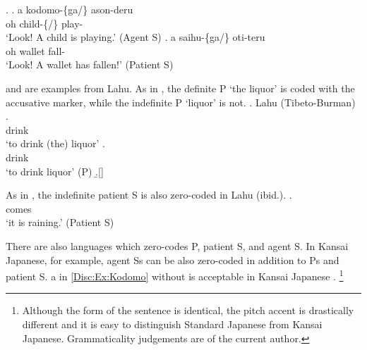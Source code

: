 \ex.\label{Disc:Ex:Kodomo}
	\ag. a kodomo-\{ga/\} ason-deru \\
		oh child-\{/\EM{\O}\} play- \\
		`Look! A child is playing.' \hfill{(Agent S)}
		\bg. a saihu-\{ga/\EM{\O}\} oti-teru \\
			oh wallet fall- \\
			`Look! A wallet has fallen!' \hfill{(Patient S)}

\Next and \NNext are examples from Lahu.
As in \Next[a],
the definite P `the liquor' is coded with the accusative marker,
while the indefinite P `liquor' is not.
\ex. Lahu (Tibeto-Burman)
 \ag.  {}  \\
	  drink \\
	`to drink (the) liquor'
 \bg.   \\
	 drink \\
	`to drink liquor' \hfill{(P)}
 \b.[] \hfill{\cite[p.\ 307]{matisoff81}}

As in \Next,
the indefinite patient S is also zero-coded in Lahu (ibid.).
	\exg. \footnotemark{}  \\
			 comes \\
			`it is raining.' \hfill{(Patient S)}

%
There are also languages which zero-codes P, patient S, and agent S.
In Kansai Japanese, for example,
agent Ss can be also zero-coded in addition to Ps and patient S.
a in \ref{Disc:Ex:Kodomo} without  is acceptable in Kansai Japanese \cite[see also][]{nakagawa13m}.%
	\footnote{
	Although the form of the sentence is identical,
	the pitch accent is drastically different and it is easy to distinguish Standard Japanese from Kansai Japanese.
	Grammaticality judgements are of the current author.
	}



